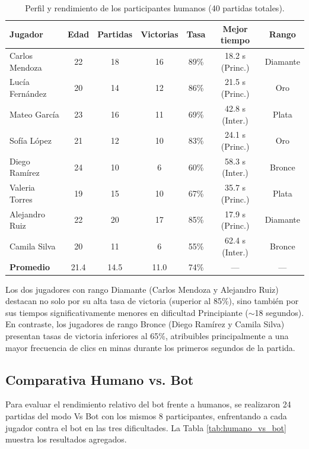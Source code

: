 \documentclass[12pt,a4paper]{article}
\begin{document}
\begin{table}[H]
\centering
\caption{Perfil y rendimiento de los participantes humanos (40 partidas totales).}
\label{tab:jugadores}
\begin{tabular}{lcccccc}
\toprule
\textbf{Jugador} & \textbf{Edad} & \textbf{Partidas} & \textbf{Victorias} & \textbf{Tasa} & \textbf{Mejor tiempo} & \textbf{Rango} \\
\midrule
Carlos Mendoza   & 22 & 18 & 16 & 89\% & 18.2 s (Princ.) & Diamante \\
Lucía Fernández  & 20 & 14 & 12 & 86\% & 21.5 s (Princ.) & Oro     \\
Mateo García     & 23 & 16 & 11 & 69\% & 42.8 s (Inter.) & Plata   \\
Sofía López      & 21 & 12 & 10 & 83\% & 24.1 s (Princ.) & Oro     \\
Diego Ramírez    & 24 & 10 & 6  & 60\% & 58.3 s (Inter.) & Bronce  \\
Valeria Torres   & 19 & 15 & 10 & 67\% & 35.7 s (Princ.) & Plata   \\
Alejandro Ruiz   & 22 & 20 & 17 & 85\% & 17.9 s (Princ.) & Diamante\\
Camila Silva     & 20 & 11 & 6  & 55\% & 62.4 s (Inter.) & Bronce  \\
\midrule
\textbf{Promedio} & 21.4 & 14.5 & 11.0 & 74\% & — & — \\
\bottomrule
\end{tabular}
\end{table}

Los dos jugadores con rango Diamante (Carlos Mendoza y Alejandro Ruiz) destacan no solo por su alta tasa de victoria (superior al 85\%), sino también por sus tiempos significativamente menores en dificultad Principiante ($\sim$18 segundos). En contraste, los jugadores de rango Bronce (Diego Ramírez y Camila Silva) presentan tasas de victoria inferiores al 65\%, atribuibles principalmente a una mayor frecuencia de clics en minas durante los primeros segundos de la partida.

\subsection{Comparativa Humano vs. Bot}

Para evaluar el rendimiento relativo del bot frente a humanos, se realizaron 24 partidas del modo Vs Bot con los mismos 8 participantes, enfrentando a cada jugador contra el bot en las tres dificultades. La Tabla \ref{tab:humano_vs_bot} muestra los resultados agregados.
\end{document}
